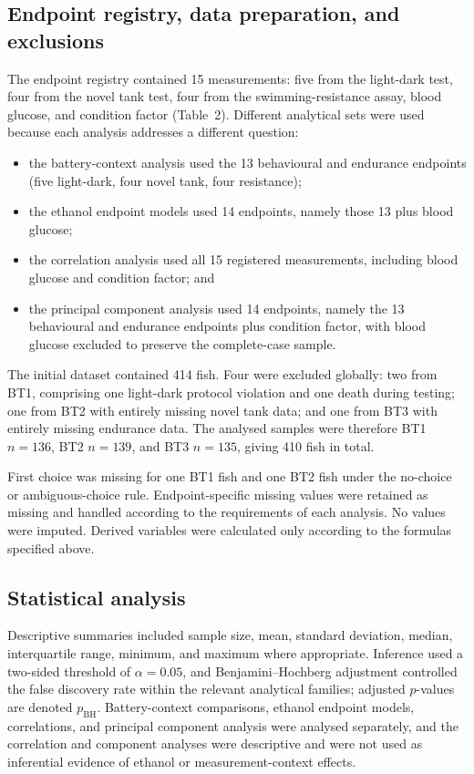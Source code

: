 \documentclass[12pt,a4paper]{article}
\begin{document}
\subsection{Endpoint registry, data preparation, and exclusions}
\label{sec:data-preparation}
The endpoint registry contained 15 measurements: five from the light-dark test, four from the novel tank test, four from the swimming-resistance assay, blood glucose, and condition factor (Table~2). Different analytical sets were used because each analysis addresses a different question:
\begin{itemize}
    \item the battery-context analysis used the 13 behavioural and endurance endpoints (five light-dark, four novel tank, four resistance);
    \item the ethanol endpoint models used 14 endpoints, namely those 13 plus blood glucose;
    \item the correlation analysis used all 15 registered measurements, including blood glucose and condition factor; and
    \item the principal component analysis used 14 endpoints, namely the 13 behavioural and endurance endpoints plus condition factor, with blood glucose excluded to preserve the complete-case sample.
\end{itemize}

The initial dataset contained 414 fish. Four were excluded globally: two from BT1, comprising one light-dark protocol violation and one death during testing; one from BT2 with entirely missing novel tank data; and one from BT3 with entirely missing endurance data. The analysed samples were therefore BT1 $n=136$, BT2 $n=139$, and BT3 $n=135$, giving 410 fish in total.

First choice was missing for one BT1 fish and one BT2 fish under the no-choice or ambiguous-choice rule. Endpoint-specific missing values were retained as missing and handled according to the requirements of each analysis. No values were imputed. Derived variables were calculated only according to the formulas specified above.

\subsection{Statistical analysis}
\label{sec:statistics}
Descriptive summaries included sample size, mean, standard deviation, median, interquartile range, minimum, and maximum where appropriate. Inference used a two-sided threshold of $\alpha=0.05$, and Benjamini--Hochberg adjustment controlled the false discovery rate within the relevant analytical families; adjusted $p$-values are denoted $p_{\mathrm{BH}}$. Battery-context comparisons, ethanol endpoint models, correlations, and principal component analysis were analysed separately, and the correlation and component analyses were descriptive and were not used as inferential evidence of ethanol or measurement-context effects.
\end{document}
